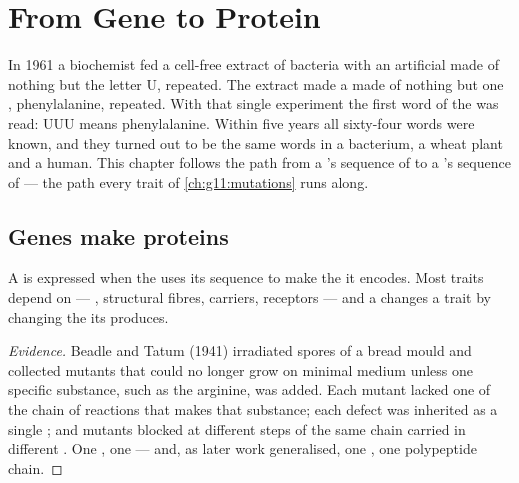 \chapter{From Gene to Protein}\label{ch:g11:gene-expression}

In 1961 a biochemist fed a cell-free extract of bacteria with an
artificial  made of nothing but the letter U, repeated. The extract
made a  made of nothing but one , phenylalanine,
repeated. With that single experiment the first word of the  was read: UUU means phenylalanine. Within five years all
sixty-four words were known, and they turned out to be the same words in
a bacterium, a wheat plant and a human. This chapter follows the path
from a 's sequence of  to a 's sequence of  --- the path every trait of \cref{ch:g11:mutations} runs along.

\section{Genes make proteins}

\begin{proposition}\label{prop:g11:gene-expression:onegene}
A  is expressed when the  uses its sequence to make the
 it encodes. Most traits depend on  --- ,
structural fibres, carriers, receptors --- and a  changes a
trait by changing the  its  produces.
\end{proposition}
\begin{proof}[Evidence]
Beadle and Tatum (1941) irradiated spores of a bread mould and
collected mutants that could no longer grow on minimal medium unless
one specific substance, such as the  arginine, was added.
Each mutant lacked one  of the chain of reactions that makes
that substance; each defect was inherited as a single ; and
mutants blocked at different steps of the same chain carried
 in different . One , one  --- and, as later
work generalised, one , one polypeptide chain.
\end{proof}

